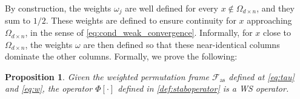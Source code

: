 \documentclass{amsart}
\theoremstyle{plain}
\newtheorem{prop}[theorem]{Proposition}
\theoremstyle{definition}
\theoremstyle{remark}
\begin{document}
By construction, the weights $\omega_j$ are well defined for every $x\not \in \Omega_{d \times n}$, and they sum to $1/2$. These weights are defined to ensure continuity for $x$ approaching $\Omega_{d \times n}$, in the sense of \eqref{eq:cond_weak_convergence}. Informally, for $x$ close to $\Omega_{d \times n}$, the weights $\omega$ are then defined so that these near-identical columns dominate the other columns. Formally, we prove the following:

\begin{prop} \label{prop:stab_operator_correct}
Given the weighted permutation frame $\mathcal{F}_{\text{as}} $ defined at \eqref{eq:tau} and \eqref{eq:w}, the operator $\Phi[\cdot]$ defined in \eqref{def:staboperator} is a  \textit{WS} operator.
\end{prop}
\end{document}
